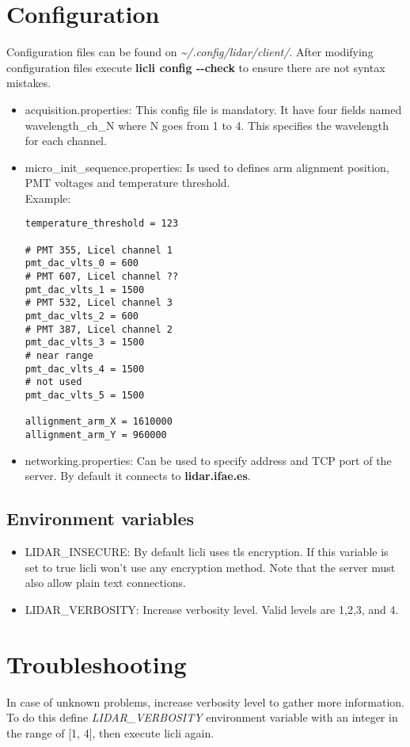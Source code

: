 \documentclass[letterpaper, 10 pt]{article}
\begin{document}
\section{Configuration} \label{cfg}
Configuration files can be found on \textit{\~{}/.config/lidar/client/}. After modifying configuration files execute \textbf{licli config -{}-check} to ensure there are not syntax mistakes.
\begin{itemize}
	\item acquisition.properties: This config file is mandatory. It have four fields named wavelength\_ch\_N where N goes from 1 to 4. This specifies the wavelength for each channel. 
	\item micro\_init\_sequence.properties: Is used to defines arm alignment position, PMT voltages and temperature threshold.	\\
	
	Example: 
	\begin{verbatim}
temperature_threshold = 123

# PMT 355, Licel channel 1
pmt_dac_vlts_0 = 600
# PMT 607, Licel channel ??
pmt_dac_vlts_1 = 1500
# PMT 532, Licel channel 3
pmt_dac_vlts_2 = 600
# PMT 387, Licel channel 2
pmt_dac_vlts_3 = 1500
# near range
pmt_dac_vlts_4 = 1500
# not used
pmt_dac_vlts_5 = 1500

allignment_arm_X = 1610000
allignment_arm_Y = 960000
	\end{verbatim}
	\item networking.properties: Can be used to specify address and TCP port of the server. By default it connects to \textbf{lidar.ifae.es}.
\end{itemize} 
\subsection{Environment variables}
\begin{itemize}
	\item LIDAR\_INSECURE: By default licli uses tls encryption. If this variable is set to true licli won't use any encryption method. Note that the server must also allow plain text connections.
	\item LIDAR\_VERBOSITY: Increase verbosity level. Valid levels are 1,2,3, and 4.
\end{itemize}

\section{Troubleshooting}
In case of unknown problems, increase verbosity level to gather more information. To do this define \emph{LIDAR\_VERBOSITY} environment variable with an integer in the range of [1, 4], then execute licli again.
\end{document}
